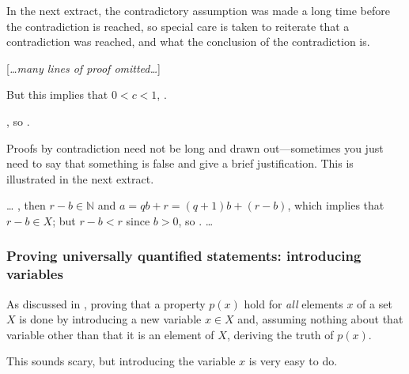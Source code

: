 In the next extract, the contradictory assumption was made a long time before the contradiction is reached, so special care is taken to reiterate that a contradiction was reached, and what the conclusion of the contradiction is.

\begin{extract}
\label{xtrContradictionExampleTwo}

[\textit{\dots{}many lines of proof omitted\dots{}}]

But this implies that $0 < c < 1$, .

, so .
\end{extract}

Proofs by contradiction need not be long and drawn out---sometimes you just need to say that something is false and give a brief justification. This is illustrated in the next extract.

\begin{extract}
\label{xtrContradictionOneLineExample}
\dots{} , then $r-b \in \mathbb{N}$ and $a = qb+r = (q+1)b + (r-b)$, which implies that $r-b \in X$; but $r-b<r$ since $b>0$, so .  \dots{}
\end{extract}

\subsubsection*{Proving universally quantified statements: introducing variables}

As discussed in , proving that a property $p(x)$ hold for \textit{all} elements $x$ of a set $X$ is done by introducing a new variable $x \in X$ and, assuming nothing about that variable other than that it is an element of $X$, deriving the truth of $p(x)$.

This sounds scary, but introducing the variable $x$ is very easy to do.

